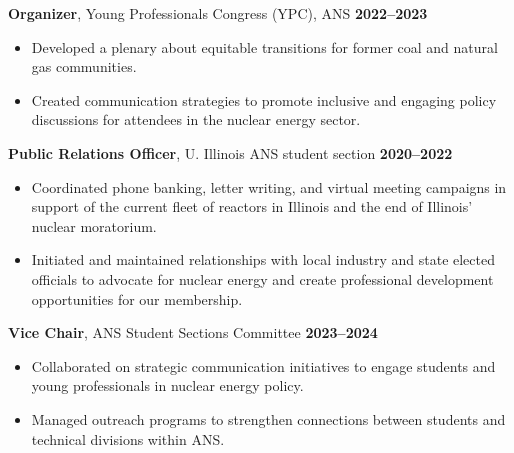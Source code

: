 \documentclass[margin,line]{resume}
\begin{document}
\begin{resume}
    \textbf{Organizer}, Young Professionals Congress (YPC), ANS \hfill \textbf{2022--2023}\vspace{.5mm}\\%
    \begin{itemize}
        \item Developed a plenary about equitable transitions for former coal and natural gas communities.
        \item Created communication strategies to promote inclusive and engaging policy discussions for attendees in the nuclear energy sector.
    \end{itemize}

    \textbf{Public Relations Officer}, U. Illinois ANS student section  \hfill \textbf{2020--2022}\vspace{.5mm}\\%
    \begin{itemize}
        \item Coordinated phone banking, letter writing, and virtual meeting campaigns in support of the current fleet of reactors in Illinois and the end of Illinois' nuclear moratorium.
        \item Initiated and maintained relationships with local industry and state elected officials to advocate for nuclear energy and create professional development opportunities for our membership.
    \end{itemize}

    \textbf{Vice Chair}, ANS Student Sections Committee  \hfill \textbf{2023--2024}\vspace{.5mm}\\%
    \begin{itemize}
        \item Collaborated on strategic communication initiatives to engage students and young professionals in nuclear energy policy.
        \item Managed outreach programs to strengthen connections between students and technical divisions within ANS.
    \end{itemize}

\end{resume}
\end{document}
